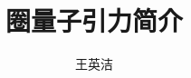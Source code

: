 \documentclass[11pt]{ctexbook}
\title{圈量子引力简介}
\author{王英洁}
\begin{document}
	\maketitle
	\tableofcontents

	\printnomenclature
	
	
	
	
	
	
	
	

	\printbibliography
\end{document}
